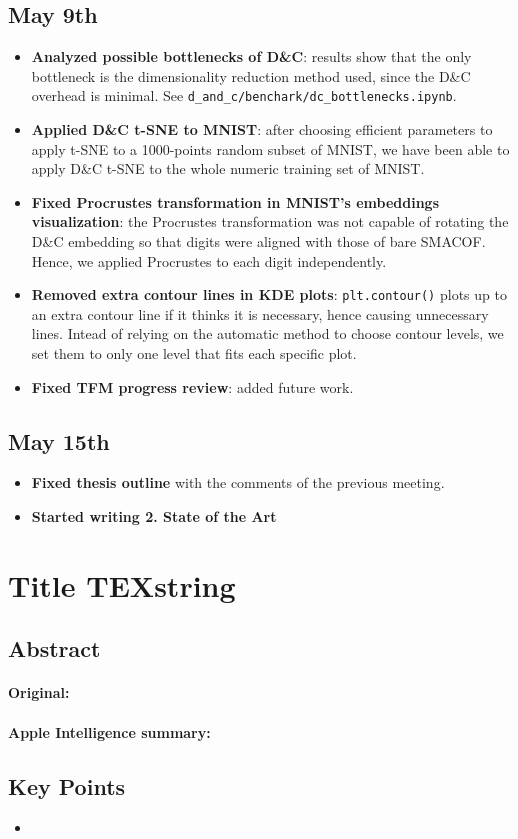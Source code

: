 \documentclass[a4paper,12pt]{article}
\begin{document}
\subsection{May 9th}
\begin{itemize}
    \item \textbf{Analyzed possible bottlenecks of D\&C}: results show that the only bottleneck is the dimensionality reduction method used, since the D\&C overhead is minimal. See \verb|d_and_c/benchark/dc_bottlenecks.ipynb|.
    \item \textbf{Applied D\&C t-SNE to MNIST}: after choosing efficient parameters to apply t-SNE to a 1000-points random subset of MNIST, we have been able to apply D\&C t-SNE to the whole numeric training set of MNIST.
    \item \textbf{Fixed Procrustes transformation in MNIST's embeddings visualization}: the Procrustes transformation was not capable of rotating the D\&C embedding so that digits were aligned with those of bare SMACOF. Hence, we applied Procrustes to each digit independently.
    \item \textbf{Removed extra contour lines in KDE plots}: \verb|plt.contour()| plots up to an extra contour line if it thinks it is necessary, hence causing unnecessary lines. Intead of relying on the automatic method to choose contour levels, we set them to only one level that fits each specific plot.
    \item \textbf{Fixed TFM progress review}: added future work.
\end{itemize}

\subsection{May 15th}
\begin{itemize}
    \item \textbf{Fixed thesis outline} with the comments of the previous meeting.
    \item \textbf{Started writing 2. State of the Art}
\end{itemize}


\pagebreak
\section{Title \texorpdfstring{TEXstring}{TEXstring}}
\label{sec:}

\subsection{Abstract}

\paragraph{Original:}

\paragraph{Apple Intelligence summary:}


\subsection{Key Points}

\begin{itemize}
    \item 
\end{itemize}


\pagebreak
\printbibliography
\end{document}

